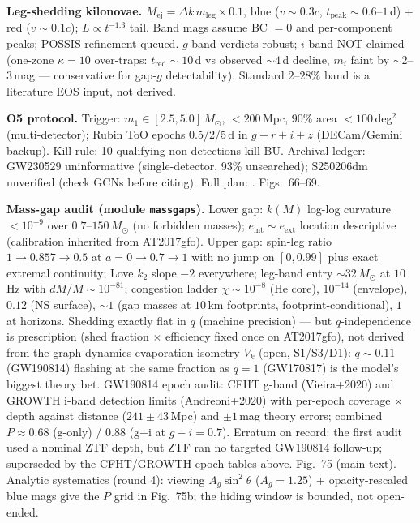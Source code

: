 \documentclass[11pt]{article}
\begin{document}
\textbf{Leg-shedding kilonovae.} $M_{\mathrm{ej}} = \Delta k\,m_{\mathrm{leg}}
\times 0.1$, blue ($v \sim 0.3c$, $t_{\mathrm{peak}} \sim 0.6$--$1$\,d) + red
($v \sim 0.1c$); $L \propto t^{-1.3}$ tail. Band mags assume BC $= 0$ and
per-component peaks; POSSIS refinement queued. $g$-band verdicts robust;
$i$-band NOT claimed (one-zone $\kappa = 10$ over-traps: $t_{\mathrm{red}}
\sim 10$\,d vs observed $\sim 4$\,d decline, $m_i$ faint by $\sim 2$--$3$\,mag
--- conservative for gap-$g$ detectability). Standard $2$--$28\%$ band is a
literature EOS input, not derived.

\textbf{O5 protocol.} Trigger: $m_1 \in [2.5,5.0]\,M_\odot$, $< 200$\,Mpc,
90\% area $< 100$\,deg$^2$ (multi-detector); Rubin ToO epochs 0.5/2/5\,d in
$g+r+i+z$ (DECam/Gemini backup). Kill rule: 10 qualifying non-detections kill
BU. Archival ledger: GW230529 uninformative (single-detector, 93\% unsearched);
S250206dm unverified (check GCNs before citing). Full plan:
. Figs.~66--69.

\textbf{Mass-gap audit (module \texttt{massgaps}).} Lower gap: $k(M)$ log-log
curvature $< 10^{-9}$ over $0.7$--$150\,M_\odot$ (no forbidden masses);
$e_{\mathrm{int}} \sim e_{\mathrm{ext}}$ location descriptive (calibration
inherited from AT2017gfo). Upper gap: spin-leg ratio $1 \to 0.857 \to 0.5$
at $a = 0 \to 0.7 \to 1$ with no jump on $[0,0.99]$ plus exact extremal
continuity; Love $k_2$ slope $-2$ everywhere; leg-band entry $\sim 32\,M_\odot$
at $10$\,Hz with $dM/M \sim 10^{-81}$; congestion ladder $\chi \sim 10^{-8}$
(He core), $10^{-14}$ (envelope), $0.12$ (NS surface), $\sim 1$ (gap masses
at $10$\,km footprints, footprint-conditional), $1$ at horizons. Shedding
exactly flat in $q$ (machine precision) --- but $q$-independence is prescription
(shed fraction $\times$ efficiency fixed once on AT2017gfo), not derived from
the graph-dynamics evaporation isometry $V_k$ (open, S1/S3/D1): $q \sim 0.11$
(GW190814) flashing at the same fraction as $q = 1$ (GW170817) is the
model's biggest theory bet. GW190814 epoch audit: CFHT g-band
(Vieira+2020) and GROWTH i-band detection limits (Andreoni+2020) with
per-epoch coverage $\times$ depth against distance ($241 \pm 43$\,Mpc) and
$\pm 1$\,mag theory errors; combined $P \approx 0.68$ (g-only) / $0.88$
(g+i at $g-i = 0.7$). Erratum on record: the first audit used a nominal ZTF
depth, but ZTF ran no targeted GW190814 follow-up; superseded by the
CFHT/GROWTH epoch tables above. Fig.~75 (main text). Analytic systematics (round 4): viewing $A_g \sin^2\theta$ ($A_g = 1.25$) + opacity-rescaled blue mags give the $P$ grid in Fig.~75b; the hiding window is bounded, not open-ended.
\end{document}
